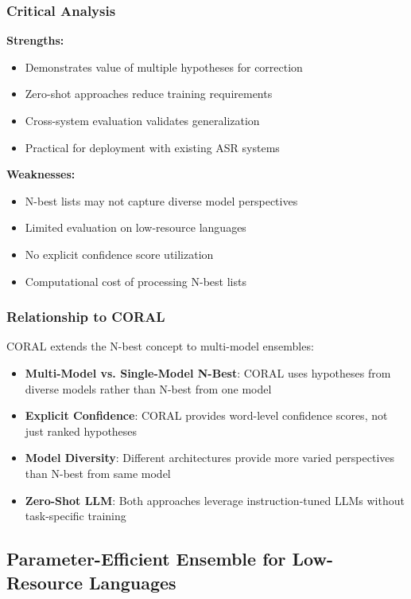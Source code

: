 \subsubsection{Critical Analysis}

\textbf{Strengths:}
\begin{itemize}[topsep=4pt,itemsep=2pt]
    \item Demonstrates value of multiple hypotheses for correction
    \item Zero-shot approaches reduce training requirements
    \item Cross-system evaluation validates generalization
    \item Practical for deployment with existing ASR systems
\end{itemize}

\textbf{Weaknesses:}
\begin{itemize}[topsep=4pt,itemsep=2pt]
    \item N-best lists may not capture diverse model perspectives
    \item Limited evaluation on low-resource languages
    \item No explicit confidence score utilization
    \item Computational cost of processing N-best lists
\end{itemize}

\subsubsection{Relationship to CORAL}

CORAL extends the N-best concept to multi-model ensembles:

\begin{itemize}[topsep=4pt,itemsep=2pt]
    \item \textbf{Multi-Model vs. Single-Model N-Best}: CORAL uses hypotheses from diverse models rather than N-best from one model
    \item \textbf{Explicit Confidence}: CORAL provides word-level confidence scores, not just ranked hypotheses
    \item \textbf{Model Diversity}: Different architectures provide more varied perspectives than N-best from same model
    \item \textbf{Zero-Shot LLM}: Both approaches leverage instruction-tuned LLMs without task-specific training
\end{itemize}

\subsection{Parameter-Efficient Ensemble for Low-Resource Languages}


